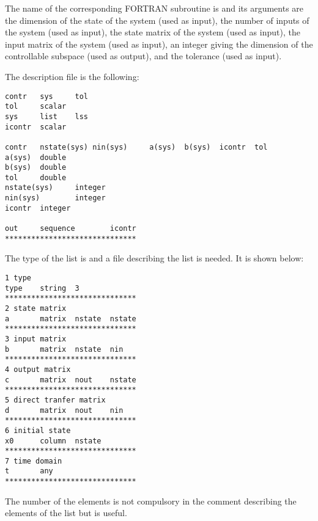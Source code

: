 The name of the corresponding FORTRAN subroutine is  and its
arguments are the dimension of the state of the system (used as input), the
number of inputs of the system (used as input), 
the state matrix of the system (used as input),
the input matrix of the system (used as input),
an integer giving the dimension of the controllable subspace (used as output),
and the tolerance (used as input).

The description file is the following:
\begin{verbatim}
contr   sys     tol
tol     scalar
sys     list    lss
icontr  scalar

contr   nstate(sys)	nin(sys)     a(sys)  b(sys)  icontr  tol
a(sys)  double
b(sys)  double
tol     double
nstate(sys)     integer
nin(sys)        integer
icontr  integer

out     sequence        icontr
******************************
\end{verbatim}

The type of the list is  and a file describing the list  is
needed. It is shown below:

\begin{verbatim}
1 type
type    string  3
******************************
2 state matrix
a       matrix  nstate  nstate
******************************
3 input matrix
b       matrix  nstate  nin
******************************
4 output matrix
c       matrix  nout    nstate
******************************
5 direct tranfer matrix
d       matrix  nout    nin
******************************
6 initial state
x0      column  nstate
******************************
7 time domain
t       any
******************************
\end{verbatim}

The number of the elements is not compulsory in the comment describing the
elements of the list but is useful.

